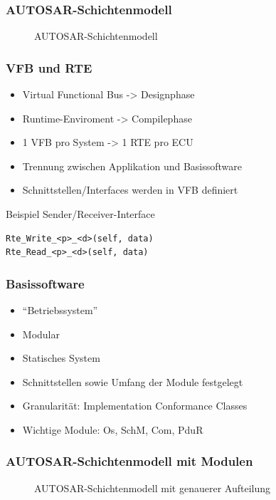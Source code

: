 \documentclass[]{beamer}
\newcommand{\inputImage}[1]{}
\begin{document}
\begin{frame}
\frametitle{AUTOSAR-Schichtenmodell}
    \begin{figure}[ht]
        \centering
        \resizebox{0.98\linewidth}{!}{\inputImage{autosar_layer.dia}}
        \caption{AUTOSAR-Schichtenmodell}
        \label{fig:autosar_layer}
    \end{figure}
\end{frame}

\begin{frame}[fragile]
\frametitle{VFB und RTE}
    \begin{itemize}
        \item Virtual Functional Bus -> Designphase
        \item Runtime-Enviroment -> Compilephase
        \item 1 VFB pro System -> 1 RTE pro ECU
        \item Trennung zwischen Applikation und Basissoftware
        \item Schnittstellen/Interfaces werden in VFB definiert
    \end{itemize}
    \begin{exampleblock}{Beispiel Sender/Receiver-Interface}
        \begin{verbatim}
Rte_Write_<p>_<d>(self, data)
Rte_Read_<p>_<d>(self, data)
        \end{verbatim}
    \end{exampleblock}
\end{frame}


\begin{frame}
\frametitle{Basissoftware}
    \begin{itemize}
        \item "`Betriebssystem"'
        \item Modular
        \item Statisches System
        \item Schnittstellen sowie Umfang der Module festgelegt
        \item Granularität: Implementation Conformance Classes
        \item Wichtige Module: Os, SchM, Com, PduR
    \end{itemize}
\end{frame}


\begin{frame}
\frametitle{AUTOSAR-Schichtenmodell mit Modulen}
    \begin{figure}[ht]
        \centering
        \resizebox{0.98\linewidth}{!}{\inputImage{autosar_refined_layer.dia}}
        \caption{AUTOSAR-Schichtenmodell mit genauerer Aufteilung}
        \label{fig:autosar_refined_layer}
    \end{figure}
\end{frame}
\end{document}
